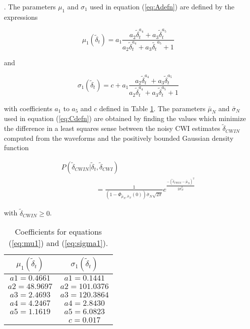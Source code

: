 \documentclass[12pt,double]{article}
\begin{document}
\citep{dr_Robinson11a}. The parameters $\mu_1$ and $\sigma_1$ used
in equation (\ref{eq:Adefn}) are defined by the expressions
\begin{linenomath*} \begin{equation}
\label{eq:mu1}
\mu_1(\widetilde{\delta}_t) = a_1\frac{a_2 \widetilde{\delta}_t^{a_4}+a_3
\widetilde{\delta}_t^{a_5}}{a_2 \widetilde{\delta}_t^{a_4}+a_3 \widetilde{\delta_t}^{a_5}+1}
\end{equation} \end{linenomath*}
and
\begin{linenomath*} \begin{equation}
\label{eq:sigma1}
\sigma_1(\widetilde{\delta}_t) = c + a_1\frac{a_2 \widetilde{\delta}_t^{a_4}+
a_3 \widetilde{\delta}_t^{a_5}}{a_2 \widetilde{\delta}_t^{a_4}+a_3 \widetilde{\delta}_t^{a_5}+1}
\end{equation} \end{linenomath*}
with coefficients $a_1$ to $a_5$ and $c$ defined in Table
\ref{tab-const4-mu1-sigma1}. The parameters $\bar{\mu}_N$ and
$\bar{\sigma}_N$ used in equation (\ref{eq:Cdefn}) are obtained by
finding the values which minimize the difference in a least squares
sense between the noisy CWI estimates $\widetilde{\delta}_{CWIN}$
computed from the waveforms and the positively bounded Gaussian
density function
\begin{linenomath*} \begin{equation}
\label{eq-likelihood-noisydata-pdf-orig}
\begin{array}{l}
P(\widetilde{\delta}_{CWIN}|\widetilde{\delta}_t,\widetilde{\delta}_{CWI}) \\
\hspace{5em} = \frac{1}{\left(1-\Phi_{\bar{\mu}_N,\bar{\sigma}_N}(0)\right)\bar{\sigma}_N\sqrt{2\pi}}
e^{  \frac{-(\widetilde{\delta}_{CWIN}-\bar{\mu}_N)^2}{2\bar{\sigma}_N^2}  }
\end{array}
\end{equation} \end{linenomath*}
with $\widetilde{\delta}_{CWIN} \geq 0$.


\begin{table}
\caption{Coefficients for equations (\ref{eq:mu1}) and
(\ref{eq:sigma1}).} \label{tab-const4-mu1-sigma1}
\begin{tabular}{|c|c|}
\hline
$\mu_1(\widetilde{\delta}_t)$ & $\sigma_1(\widetilde{\delta}_t)$ \\
\hline
$a1 = 0.4661$ & $a1 = 0.1441$\\
$a2 = 48.9697$ & $a2 = 101.0376$\\
$a3 = 2.4693$ & $a3 = 120.3864$\\
$a4 = 4.2467$ & $a4 = 2.8430$\\
$a5 = 1.1619$ & $a5 = 6.0823$ \\
     & $c = 0.017$ \\
\hline
\end{tabular}
\end{table}
\end{document}
